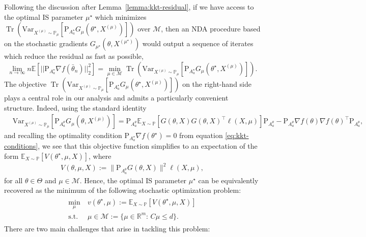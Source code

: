 \documentclass[11pt,a4paper]{article}
\theoremstyle{definition}
\DeclareMathOperator*{\st}{s.t.}
\DeclareMathOperator*{\trace}{Tr}
\begin{document}
Following the discussion after Lemma~\ref{lemma:kkt-residual}, if we have access to the optimal IS parameter $\mu^\star$ which minimizes $ \trace\left(\text{Var}_{X^{(\mu)} \sim \mathbb P_\mu}\left[\text{P}_{A^\star_{a}} G_\mu(\theta^\star, X^{(\mu)})\right]\right)$ over $\mathcal M$, then an NDA procedure based on the stochastic gradients $G_{\mu^\star}(\theta,X^{(\mu^\star)})$ would output a sequence of iterates which reduce the residual as fast as possible,
\begin{equation*}
    \lim_{n\to\infty} n \mathbb E \left[ ||\text{P}_{A^\star_{a}} \nabla  f(\bar \theta_n)||_2^2 \right] = \min_{\mu\in \mathcal M} \trace\left(\text{Var}_{X^{(\mu)} \sim \mathbb P_\mu}\left[\text{P}_{A^\star_{a}} G_\mu(\theta^\star, X^{(\mu)})\right]\right).
\end{equation*}
The objective $\trace\left(\text{Var}_{X^{(\mu)} \sim \mathbb P_\mu}\left[\text{P}_{A^\star_{a}} G_\mu(\theta^\star, X^{(\mu)})\right]\right)$ on the right-hand side plays a central role in our analysis and admits a particularly convenient structure. Indeed, using the standard identity
\begin{align*}
  & \text{Var}_{X^{(\mu)} \sim \mathbb P_\mu}\left[\text{P}_{A^\theta_{a}} G_\mu(\theta, X^{(\mu)})\right] 
  = \text{P}_{A^\theta_{a}} \mathbb E_{X \sim \mathbb P}\left[ G(\theta, X) G(\theta, X)^\top  \ell(X, \mu)\right] \text{P}_{A^\theta_{a}} - \text{P}_{A^\theta_{a}} \nabla  f(\theta) \nabla  f(\theta)^\top \text{P}_{A^\theta_{a}},
\end{align*}
and recalling the optimality condition $\text{P}_{A^\star_{a}} \nabla  f(\theta^\star) = 0$ from equation \eqref{eq:kkt-conditions}, we see that this objective function simplifies to an expectation of the form $\mathbb E_{X \sim \mathbb P}\left[V(\theta^\star, \mu, X)\right]$, where 
\begin{align*}
    V(\theta, \mu, X):=\|\text{P}_{A_{a}^\theta}G(\theta,X)\|^2\ell(X,\mu),
\end{align*}
for all $\theta\in \Theta$ and $\mu \in \mathcal M$.
Hence, the optimal IS parameter $\mu^\star$ can be equivalently recovered as the minimum of the following stochastic optimization problem:
\begin{align}
  \label{eq:optimal:IS:2}
  \begin{split}
    \min_{\mu} & ~v(\theta^\star,\mu):=\mathbb E_{X \sim \mathbb P}\left[V(\theta^\star, \mu, X)\right]\\
    \st & ~\mu \in \mathcal M:=\{\mu \in \mathbb R^m:\, C \mu \leq d\}.
  \end{split}
  \tag{IS}
\end{align}
There are two main challenges that arise in tackling this problem:
\end{document}
